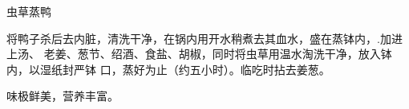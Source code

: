 \begin{recipe}{虫草蒸鸭}

\ingredients


\preparation

将鸭子杀后去内脏，清洗干净，在锅内用开水稍煮去其血水，盛在蒸钵内，.加进上汤、
老姜、葱节、绍酒、食盐、胡椒，同时将虫草用温水淘洗干净，放入钵内，以湿纸封严钵
口，蒸好为止（约五小时）。临吃时拈去姜葱。

\features

味极鲜美，营养丰富。

\end{recipe}

